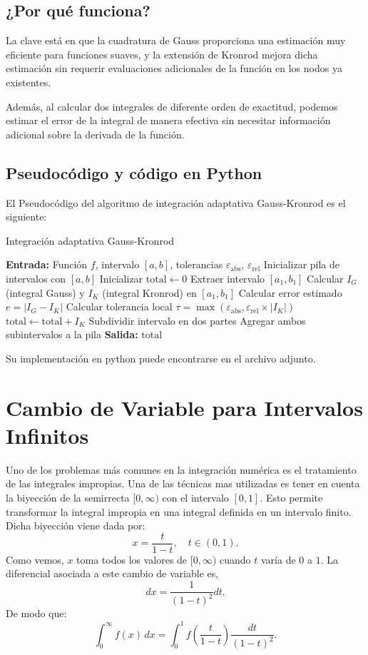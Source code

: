 \documentclass{article}
\begin{document}
\subsection{¿Por qué funciona?}
La clave está en que la cuadratura de Gauss proporciona una estimación muy eficiente para funciones suaves, y la extensión de Kronrod mejora dicha estimación sin requerir evaluaciones adicionales de la función en los nodos ya existentes.

Además, al calcular dos integrales de diferente orden de exactitud, podemos estimar el error de la integral de manera efectiva sin necesitar información adicional sobre la derivada de la función.

\subsection{Pseudocódigo y código en Python}
El Pseudocódigo del algoritmo de integración adaptativa Gauss-Kronrod es el siguiente:
\begin{algorithm}[H]
\caption{Integración adaptativa Gauss-Kronrod}
\begin{algorithmic}[1]
\STATE \textbf{Entrada:} Función $f$, intervalo $[a,b]$, tolerancias $\varepsilon_{\text{abs}}$, $\varepsilon_{\text{rel}}$
\STATE Inicializar pila de intervalos con $[a,b]$
\STATE Inicializar $\text{total} \leftarrow 0$
    \STATE Extraer intervalo $[a_1,b_1]$
    \STATE Calcular $I_G$ (integral Gauss) y $I_K$ (integral Kronrod) en $[a_1,b_1]$
    \STATE Calcular error estimado $e = |I_G - I_K|$
    \STATE Calcular tolerancia local $\tau = \max(\varepsilon_{\text{abs}}, \varepsilon_{\text{rel}} \times |I_K|)$
        \STATE $\text{total} \leftarrow \text{total} + I_K$
    \ELSE
        \STATE Subdividir intervalo en dos partes
        \STATE Agregar ambos subintervalos a la pila
    \ENDIF
\ENDWHILE
\STATE \textbf{Salida:} $\text{total}$
\end{algorithmic}
\end{algorithm}
Su implementación en python puede encontrarse en el archivo adjunto. 



\section{Cambio de Variable para Intervalos Infinitos}
Uno de los problemas más comunes en la integración numérica es el tratamiento de las integrales impropias. Una de las técnicas mas utilizadas es tener en cuenta la biyección de la semirrecta $[0, \infty)$ con el intervalo $[0, 1]$. Esto permite transformar la integral impropia en una integral definida en un intervalo finito. Dicha biyección viene dada por:
\[
    x = \frac{t}{1-t}, \quad t \in (0,1).
\]
Como vemos, $x$ toma todos los valores de $[0, \infty)$ cuando $t$ varía de $0$ a $1$. La diferencial asociada a este cambio de variable es, 
\[
    dx = \frac{1}{(1-t)^2} dt.
\]
De modo que:
\[
    \int_0^{\infty} f(x) \, dx = \int_0^1 f\left(\frac{t}{1-t}\right) \frac{dt}{(1-t)^2}.
\]
\end{document}
